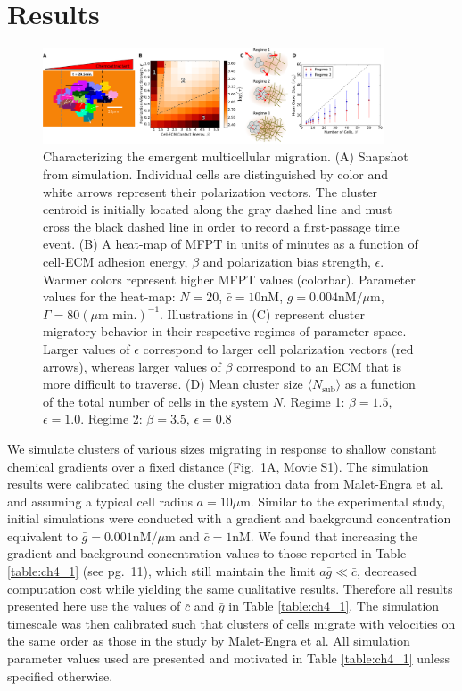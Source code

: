 \section{Results}


\begin{figure}[ht]
    \centering
        \includegraphics[width=0.90\textwidth]{../fig/ch4_fig2.png}
    \caption{Characterizing the emergent multicellular migration. (A) Snapshot from simulation. Individual cells are distinguished by color and white arrows represent their polarization vectors. The cluster centroid is initially located along the gray dashed line and must cross the black dashed line in order to record a first-passage time event. (B) A heat-map of MFPT in units of minutes as a function of cell-ECM adhesion energy, $\beta$ and polarization bias strength, $\epsilon$. Warmer colors represent higher MFPT values (colorbar). Parameter values for the heat-map: $N = 20$, $\bar{c} = 10\text{nM}$, $g = 0.004\text{nM}/\mu\text{m}$, $\Gamma = 80 (\mu\text{m min.})^{-1}$. Illustrations in (C) represent cluster migratory behavior in their respective regimes of parameter space. Larger values of $\epsilon$ correspond to larger cell polarization vectors (red arrows), whereas larger values of $\beta$ correspond to an ECM that is more difficult to traverse. (D) Mean cluster size
    $\langle N_\text{sub} \rangle$
    as a function of the total number of cells in the system $N$. Regime 1: $\beta = 1.5$, $\epsilon = 1.0$. Regime 2: $\beta = 3.5$, $\epsilon = 0.8$} \label{fig:heat}
\end{figure}


We simulate clusters of various sizes migrating in response to shallow constant chemical gradients over a fixed distance (Fig.\ \ref{fig:heat}A, Movie S1). The simulation results were calibrated using the cluster migration data from Malet-Engra et al.\ \cite{malet2015collective} and assuming a typical cell radius $a = 10 \mu\text{m}$. Similar to the experimental study, initial simulations were conducted with a gradient and background concentration equivalent to $\bar{g} = 0.001 \text{nM}/\mu\text{m}$ and $\bar{c} = 1 \text{nM}$. We found that increasing the gradient and background concentration values to those reported in Table \ref{table:ch4_1} (see pg.\ 11), which still maintain the limit
$a\bar{g} \ll \bar{c}$,
decreased computation cost while yielding the same qualitative results. Therefore all results presented here use the values of $\bar{c}$ and $\bar{g}$ in Table \ref{table:ch4_1}. The simulation timescale was then calibrated such that clusters of cells migrate with velocities on the same order as those in the study by Malet-Engra et al. All simulation parameter values used are presented and motivated in Table \ref{table:ch4_1} unless specified otherwise.

